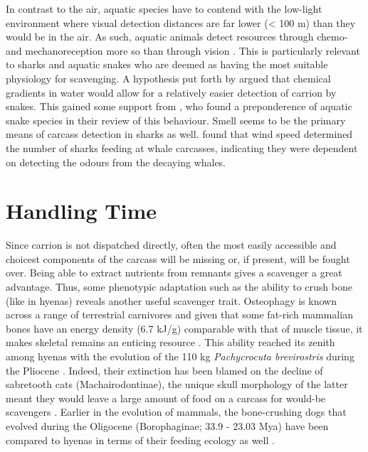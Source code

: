 \documentclass[a4paper,12pt]{article}
\begin{document}
In contrast to the air, aquatic species have to contend with the low-light environment where visual detection distances are far lower (< 100 m) than they would be in the air.
As such, aquatic animals detect resources through chemo- and mechanoreception more so than through vision \citep{ruxton2004energetic}.
This is particularly relevant to sharks and aquatic snakes who are deemed as having the most suitable physiology for scavenging.
A hypothesis put forth by \cite{sazima1990necrofagia} argued that chemical gradients in water would allow for a relatively easier detection of carrion by snakes.
This gained some support from \cite{devault2002scavenging}, who found a preponderence of aquatic snake species in their review of this behaviour.
Smell seems to be the primary means of carcass detection in sharks as well. 
\cite{fallows2013white} found that wind speed %
 determined the number of sharks feeding at whale carcasses, indicating they were dependent on detecting the odours from the decaying whales. 





\section*{Handling Time}
Since carrion is not dispatched directly, often the most easily accessible and choicest components of the carcass will be missing or, if present, will be fought over.
Being able to extract nutrients from remnants gives a scavenger a great advantage.
Thus, some phenotypic adaptation such as the ability to crush bone (like in hyenas) reveals another useful scavenger trait.
Osteophagy is known across a range of terrestrial carnivores and given that some fat-rich mammalian bones have an energy density (6.7 kJ/g) comparable with that of muscle tissue, it makes skeletal remains an enticing resource \citep{brown1989study}.
This ability reached its zenith among hyenas with the evolution of the 110 kg \textit{Pachycrocuta brevirostris} during the Pliocene \citep[3.6 - 2.58 Mya; ][]{palmqvist2011giant}.
Indeed, their extinction has been blamed on the decline of sabretooth cats (Machairodontinae), the unique skull morphology of the latter meant they would leave a large amount of food on a carcass for would-be scavengers \citep{palmqvist2011giant}. 
Earlier in the evolution of mammals, the bone-crushing dogs that evolved during the Oligocene (Borophaginae; 33.9 - 23.03 Mya) have been compared to hyenas in terms of their feeding ecology as well \citep{van2003chapter,martin2016pursuit}.
\end{document}
